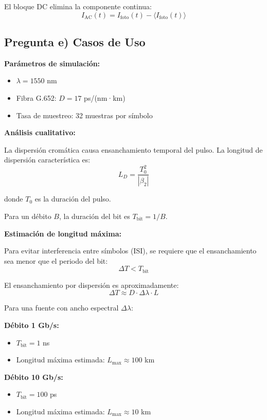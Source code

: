 \documentclass[11pt,a4paper]{article}
\begin{document}
El bloque DC elimina la componente continua:
\begin{equation}
    I_{\text{AC}}(t) = I_{\text{foto}}(t) - \langle I_{\text{foto}}(t) \rangle
\end{equation}

\subsection{Pregunta e) Casos de Uso}

\textbf{Parámetros de simulación:}
\begin{itemize}
    \item $\lambda = 1550$ nm
    \item Fibra G.652: $D = 17$ ps/(nm·km)
    \item Tasa de muestreo: 32 muestras por símbolo
\end{itemize}

\textbf{Análisis cualitativo:}

La dispersión cromática causa ensanchamiento temporal del pulso. La longitud de dispersión característica es:
\begin{equation}
    L_D = \frac{T_0^2}{|\beta_2|}
\end{equation}

donde $T_0$ es la duración del pulso.

Para un débito $B$, la duración del bit es $T_{\text{bit}} = 1/B$.

\textbf{Estimación de longitud máxima:}

Para evitar interferencia entre símbolos (ISI), se requiere que el ensanchamiento sea menor que el periodo del bit:
\begin{equation}
    \Delta T < T_{\text{bit}}
\end{equation}

El ensanchamiento por dispersión es aproximadamente:
\begin{equation}
    \Delta T \approx D \cdot \Delta\lambda \cdot L
\end{equation}

Para una fuente con ancho espectral $\Delta\lambda$:

\textbf{Débito 1 Gb/s:}
\begin{itemize}
    \item $T_{\text{bit}} = 1$ ns
    \item Longitud máxima estimada: $L_{\max} \approx 100$ km
\end{itemize}

\textbf{Débito 10 Gb/s:}
\begin{itemize}
    \item $T_{\text{bit}} = 100$ ps
    \item Longitud máxima estimada: $L_{\max} \approx 10$ km
\end{itemize}
\end{document}
